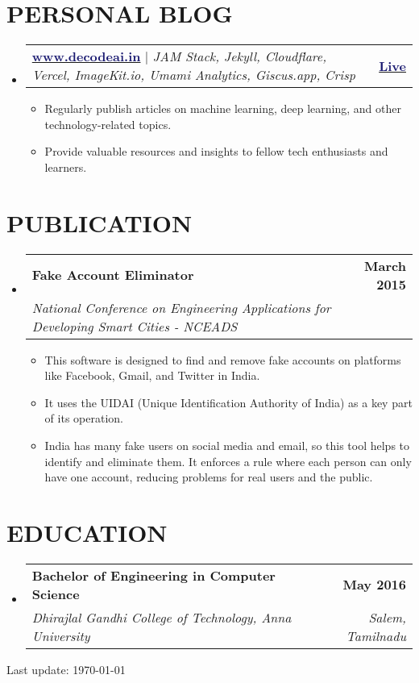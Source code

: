 \documentclass[letterpaper,11pt]{article}
\makeatletter
\newcommand{\resumeItem}[1]{
  \item\small{
    {#1 \vspace{-2pt}}
  }
}
\newcommand{\resumeSubheading}[4]{
  \vspace{-2pt}\item
    \begin{tabular*}{1.0\textwidth}[t]{l@{\extracolsep{\fill}}r}
      \textbf{#1} & \textbf{\small #2} \\
      \textit{\small#3} & \textit{\small #4} \\
    \end{tabular*}\vspace{-7pt}
}
\newcommand{\resumeProjectHeading}[2]{
    \item
    \begin{tabular*}{1.001\textwidth}{l@{\extracolsep{\fill}}r}
      \small#1 & \textbf{\small #2}\\
    \end{tabular*}\vspace{-7pt}
}
\newcommand{\resumeSubHeadingListStart}{\begin{itemize}[leftmargin=0.0in, label={}]}
\newcommand{\resumeSubHeadingListEnd}{\end{itemize}}
\newcommand{\resumeItemListStart}{\begin{itemize}}
\newcommand{\resumeItemListEnd}{\end{itemize}\vspace{-5pt}}
\makeatother
\begin{document}
%

\section{PERSONAL BLOG}
    \vspace{-5pt}
    \resumeSubHeadingListStart
      \resumeProjectHeading
         {\textbf{\href{https://www.decodeai.in}{\textcolor{MidnightBlue}{www.decodeai.in}}} $|$ \emph{JAM Stack, Jekyll, Cloudflare, Vercel, ImageKit.io, Umami Analytics, Giscus.app, Crisp }} {\href{https://www.decodeai.in}{\textcolor{MidnightBlue}{Live}}}
        \resumeItemListStart
            \resumeItem{Regularly publish articles on machine learning, deep learning, and other technology-related topics.}
            \resumeItem{Provide valuable resources and insights to fellow tech enthusiasts and learners.}
        \resumeItemListEnd
    \resumeSubHeadingListEnd


\section{PUBLICATION}
    \resumeSubHeadingListStart
        \resumeSubheading{Fake Account Eliminator}{March 2015}{National Conference on Engineering Applications for Developing Smart Cities - NCEADS}{}
            \resumeItemListStart
                \resumeItem{This software is designed to find and remove fake accounts on platforms like Facebook, Gmail, and Twitter in India.}
                \resumeItem{It uses the UIDAI (Unique Identification Authority of India) as a key part of its operation.}
                \resumeItem{India has many fake users on social media and email, so this tool helps to identify and eliminate them. It enforces a rule where each person can only have one account, reducing problems for real users and the public.}
            \resumeItemListEnd
    \resumeSubHeadingListEnd

\section{EDUCATION}
  \resumeSubHeadingListStart
    \resumeSubheading
      {Bachelor of Engineering in Computer Science }{May 2016}
      {Dhirajlal Gandhi College of Technology, Anna University}{Salem, Tamilnadu}
  \resumeSubHeadingListEnd
  
\vspace{100pt} %
\begin{center}
    Last update: \today
\end{center}
     
\end{document}
